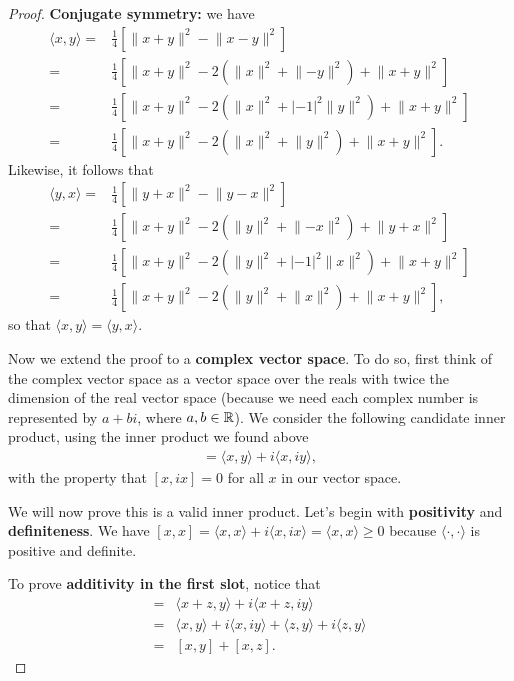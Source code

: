 \begin{proof}
    \textbf{Conjugate symmetry:} we have
    \begin{align*}
        \langle x,y\rangle =& \frac{1}{4}[\lVert x+y\rVert^2-\lVert x-y\rVert^2]\\
        =& \frac{1}{4}[\lVert x+y\rVert^2- 2(\lVert x\rVert^2+\lVert -y\rVert^2)+\lVert x+y\rVert^2]\\
        =& \frac{1}{4}[\lVert x+y\rVert^2- 2(\lVert x\rVert^2+\lvert -1\rvert^2\lVert y\rVert^2)+\lVert x+y\rVert^2]\\
        =& \frac{1}{4}[\lVert x+y\rVert^2- 2(\lVert x\rVert^2+\lVert y\rVert^2)+\lVert x+y\rVert^2].
    \end{align*}
    Likewise, it follows that
    \begin{align*}
        \langle y,x\rangle =& \frac{1}{4}[\lVert y+x\rVert^2-\lVert y-x\rVert^2]\\
        =& \frac{1}{4}[\lVert x+y\rVert^2 -2(\rVert y\lVert^2 + \lVert -x\rVert^2)+\lVert y+x\rVert^2]\\
        =& \frac{1}{4}[\lVert x+y\rVert^2 -2(\rVert y\lVert^2 + \lvert-1\rvert^2\lVert x\rVert^2)+\lVert x+y\rVert^2]\\
        =& \frac{1}{4}[\lVert x+y\rVert^2 -2(\rVert y\lVert^2 + \lVert x\rVert^2)+\lVert x+y\rVert^2],
    \end{align*}
    so that $\langle x,y\rangle=\langle y,x\rangle$.

    Now we extend the proof to a \textbf{complex vector space}. To do so, first think of the complex vector space as a vector space over the reals with twice the dimension of the real vector space (because we need each complex number is represented by $a+bi$, where $a,b\in\mathbb{R}$). We consider the following candidate inner product, using the inner product we found above
    \begin{align*}
        [x,y] = \langle x,y\rangle + i\langle x,iy\rangle,
    \end{align*}
    with the property that $[x,ix]=0$ for all $x$ in our vector space.

    We will now prove this is a valid inner product. Let's begin with \textbf{positivity} and \textbf{definiteness}. We have $[x,x] = \langle x,x\rangle +i\langle x,ix\rangle = \langle x,x\rangle \geq 0$ because $\langle \cdot,\cdot\rangle$ is positive and definite.

    To prove \textbf{additivity in the first slot}, notice that
    \begin{align*}
        [x+z,y] =& \langle x+z,y\rangle + i\langle x+z,iy\rangle\\
        =& \langle x,y\rangle + i\langle x,iy\rangle + \langle z,y\rangle + i\langle z,y\rangle\\
        =& [x,y] + [x,z].
    \end{align*}


\end{proof}
